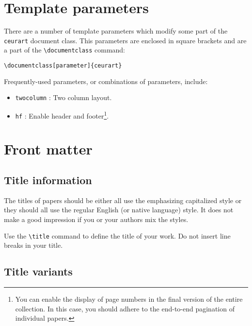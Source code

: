 \documentclass[%
twocolumn
]{ceurart}
\begin{document}
\section{Template parameters}

There are a number of template parameters which modify some part of the
\verb|ceurart|
 document class.
This parameters are enclosed in square brackets and are a part of the
\verb|\documentclass|
 command:
\begin{lstlisting}[language={[latex]TeX}]
\documentclass[parameter]{ceurart}
\end{lstlisting}

Frequently-used parameters, or combinations of parameters, include:
\begin{itemize}
\item
\verb|twocolumn|
 : Two column layout.
\item
\verb|hf|
 : Enable header and footer\footnote{You can enable the display of page numbers in the final version of the entire collection. In this case, you should adhere to the end-to-end pagination of individual papers.}.
\end{itemize}

\section{Front matter}

\subsection{Title information}

The titles of papers should be either all use the emphasizing capitalized style or they should all use the regular English (or native language) style.
It does not make a good impression if you or your authors mix the styles.

Use the
\verb|\title|
command to define the title of your work. Do not insert line breaks in your title.

\subsection{Title variants}
\end{document}
